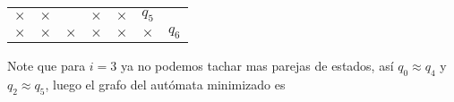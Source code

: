 \begin{itemize}
\begin{center}
\begin{tabular}{ccccccc}
                 \multicolumn{1}{|c|}{$\times$} & \multicolumn{1}{|c|}{$\times$} & \multicolumn{1}{|c|}{} & \multicolumn{1}{|c|}{$\times$} & \multicolumn{1}{|c|}{$\times$} & $q_5$ \\ \cline{1-6}
                 \multicolumn{1}{|c|}{$\times$} & \multicolumn{1}{|c|}{$\times$} & \multicolumn{1}{|c|}{$\times$} & \multicolumn{1}{|c|}{$\times$} & \multicolumn{1}{|c|}{$\times$} & \multicolumn{1}{|c|}{$\times$} & $q_6$ \\ \cline{1-6} 
                \end{tabular}
            \end{center}

            Note que para $i=3$ ya no podemos tachar mas parejas de estados, así $q_0\approx q_4$ y $q_2\approx q_5$, luego el grafo del autómata minimizado es


\end{itemize}
